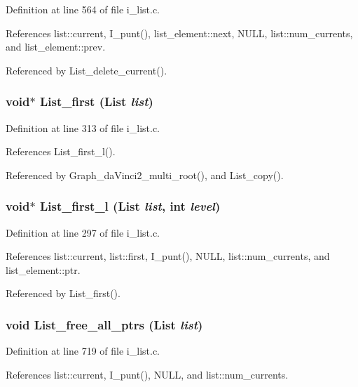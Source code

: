 Definition at line 564 of file i\_\-list.c.

References list::current, I\_\-punt(), list\_\-element::next, NULL, list::num\_\-currents, and list\_\-element::prev.

Referenced by List\_\-delete\_\-current().
\subsubsection{\setlength{\rightskip}{0pt plus 5cm}void$\ast$ List\_\-first (\bf{List} {\em list})}\label{i__list_8h_501f7638b6a227713fff0f893dd80db8}




Definition at line 313 of file i\_\-list.c.

References List\_\-first\_\-l().

Referenced by Graph\_\-da\-Vinci2\_\-multi\_\-root(), and List\_\-copy().
\subsubsection{\setlength{\rightskip}{0pt plus 5cm}void$\ast$ List\_\-first\_\-l (\bf{List} {\em list}, int {\em level})}\label{i__list_8h_e3e99885f49e231390381734b36e7883}




Definition at line 297 of file i\_\-list.c.

References list::current, list::first, I\_\-punt(), NULL, list::num\_\-currents, and list\_\-element::ptr.

Referenced by List\_\-first().
\subsubsection{\setlength{\rightskip}{0pt plus 5cm}void List\_\-free\_\-all\_\-ptrs (\bf{List} {\em list})}\label{i__list_8h_c28ce20fb755d89e8a8c87f77863a5ce}




Definition at line 719 of file i\_\-list.c.

References list::current, I\_\-punt(), NULL, and list::num\_\-currents.
